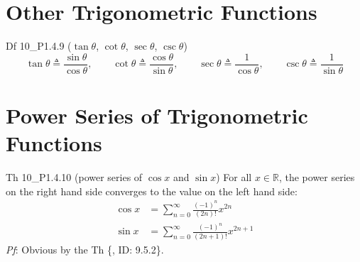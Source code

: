 \documentclass{article}
\begin{document}
\section{Other Trigonometric Functions}

\begin{Df}{Df 10\_P1.4.9 ($\tan \theta$, $\cot \theta$, $\sec \theta$, $\csc \theta$)}
    $$ \tan \theta \triangleq \frac{\sin \theta}{\cos \theta}, \qquad \cot \theta \triangleq \frac{\cos \theta}{\sin \theta}, \qquad \sec \theta \triangleq \frac{1}{\cos \theta}, \qquad \csc \theta \triangleq \frac{1}{\sin \theta} $$
\end{Df}

\section{Power Series of Trigonometric Functions}

\begin{Th}{Th 10\_P1.4.10 (power series of $\cos x$ and $\sin x$)}
    For all $x\in \mathbb{R}$, the power series on the right hand side converges to the value on the left hand side:
    $$
    \begin{aligned}
        \cos x &= \sum_{n=0}^\infty \frac{(-1)^n}{(2n)!}x^{2n} \\
        \sin x &= \sum_{n=0}^\infty \frac{(-1)^n}{(2n+1)!}x^{2n+1}
    \end{aligned}
    $$
    \tcblower
    \textit{Pf}: Obvious by the Th \{, ID: 9.5.2\}.
\end{Th}
\end{document}
